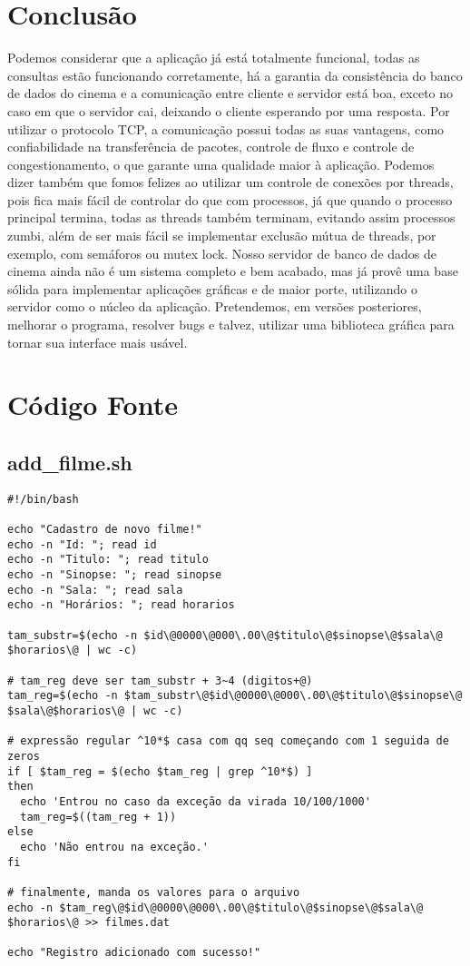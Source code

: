 \documentclass[11pt,twoside]{article}
\begin{document}
\section{Conclusão}
Podemos considerar que a aplicação já está totalmente funcional, todas as consultas estão funcionando corretamente, há a garantia da consistência do banco de dados do cinema e a comunicação entre cliente e servidor está boa, exceto no caso em que o servidor cai, deixando o cliente esperando por uma resposta.
Por utilizar o protocolo TCP, a comunicação possui todas as suas vantagens, como confiabilidade na transferência de pacotes, controle de fluxo e controle de congestionamento, o que garante uma qualidade maior à aplicação.
Podemos dizer também que fomos felizes ao utilizar um controle de conexões por threads, pois fica mais fácil de controlar do que com processos, já que quando o processo principal termina, todas as threads também terminam, evitando assim processos zumbi, além de ser mais fácil se implementar exclusão mútua de threads, por exemplo, com semáforos ou mutex lock.
Nosso servidor de banco de dados de cinema ainda não é um sistema completo e bem acabado, mas já provê uma base sólida para implementar aplicações gráficas e de maior porte, utilizando o servidor como o núcleo da aplicação. Pretendemos, em versões posteriores, melhorar o programa, resolver bugs e talvez, utilizar uma biblioteca gráfica para tornar sua interface mais usável. 

\section{Código Fonte}

\subsection{add\_filme.sh}  %
\begin{verbatim}
#!/bin/bash

echo "Cadastro de novo filme!"
echo -n "Id: "; read id
echo -n "Titulo: "; read titulo
echo -n "Sinopse: "; read sinopse
echo -n "Sala: "; read sala
echo -n "Horários: "; read horarios

tam_substr=$(echo -n $id\@0000\@000\.00\@$titulo\@$sinopse\@$sala\@
$horarios\@ | wc -c)

# tam_reg deve ser tam_substr + 3~4 (digitos+@)
tam_reg=$(echo -n $tam_substr\@$id\@0000\@000\.00\@$titulo\@$sinopse\@
$sala\@$horarios\@ | wc -c)

# expressão regular ^10*$ casa com qq seq começando com 1 seguida de zeros
if [ $tam_reg = $(echo $tam_reg | grep ^10*$) ]
then
  echo 'Entrou no caso da exceção da virada 10/100/1000'
  tam_reg=$((tam_reg + 1))
else
  echo 'Não entrou na exceção.'
fi

# finalmente, manda os valores para o arquivo
echo -n $tam_reg\@$id\@0000\@000\.00\@$titulo\@$sinopse\@$sala\@
$horarios\@ >> filmes.dat

echo "Registro adicionado com sucesso!"
\end{verbatim}
\end{document}
